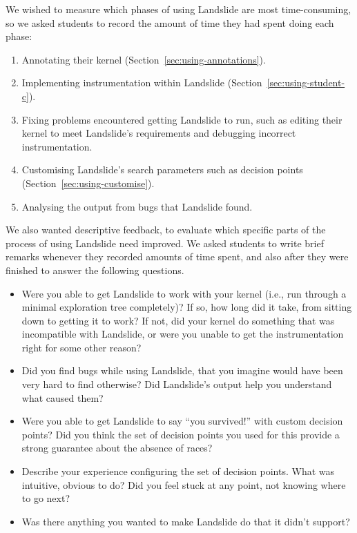 We wished to measure which phases of using Landslide are most time-consuming, so we asked students  to record the amount of time they had spent doing each phase:

\begin{enumerate}
	\item Annotating their kernel (Section~\ref{sec:using-annotations}).
	\item Implementing instrumentation within Landslide (Section~\ref{sec:using-student-c}).
	\item Fixing problems encountered getting Landslide to run, such as editing their kernel to meet Landslide's requirements and debugging incorrect instrumentation.
	\item Customising Landslide's search parameters such as decision points (Section~\ref{sec:using-customise}).
	\item Analysing the output from bugs that Landslide found.
\end{enumerate}

We also wanted descriptive feedback, to evaluate which specific parts of the process of using Landslide need improved. We asked students to write brief remarks whenever they recorded amounts of time spent, and also after they were finished to answer the following questions.

\begin{itemize}
	\item Were you able to get Landslide to work with your kernel (i.e., run through a minimal exploration tree completely)? If so, how long did it take, from sitting down to getting it to work? If not, did your kernel do something that was incompatible with Landslide, or were you unable to get the instrumentation right for some other reason?
	\item Did you find bugs while using Landslide, that you imagine would have been very hard to find otherwise? Did Landslide's output help you understand what caused them?
	\item Were you able to get Landslide to say ``you survived!'' with custom decision points? Did you think the set of decision points you used for this provide a strong guarantee about the absence of races?
	\item Describe your experience configuring the set of decision points. What was intuitive, obvious to do? Did you feel stuck at any point, not knowing where to go next?
	\item Was there anything you wanted to make Landslide do that it didn't support?
\end{itemize}

